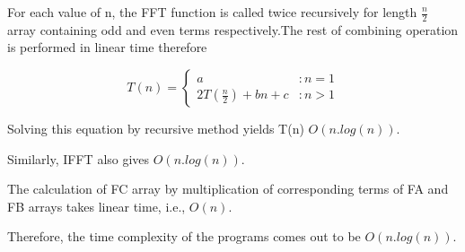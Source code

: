 \documentclass[a4paper,11pt]{article}
\begin{document}
\begin{enumerate}
For each value of n, the FFT function is called twice recursively for length $\frac{n}{2}$ array containing odd and even terms respectively.The rest of combining operation is performed in linear time therefore

 \begin{displaymath}   T(n) = \left\{
     \begin{array}{lr}
       a & : n = 1\\
       2T(\frac{n}{2}) + bn +c & : n > 1
     \end{array}
   \right.
\end{displaymath}

Solving this equation by recursive method yields T(n) $O (n.log(n))$.

Similarly, IFFT also gives $O(n.log(n))$. 

The calculation of FC array by multiplication of corresponding terms of FA and FB arrays takes linear time, i.e., $O(n)$.

Therefore, the time complexity of the programs comes out to be $O(n.log(n))$.

\end{enumerate}
\end{document}
